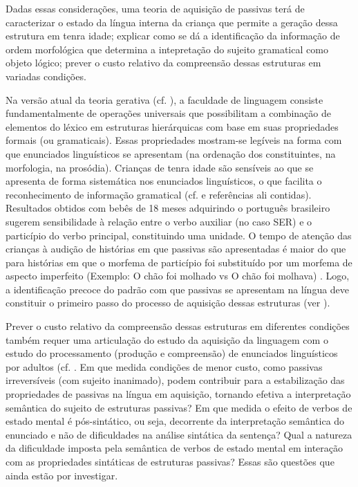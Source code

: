 \documentclass[output=paper]{LSP/langsci}
\begin{document}
Dadas essas considerações, uma teoria de aquisição de passivas terá de caracterizar o estado da língua interna da criança que permite a geração dessa estrutura em tenra idade; explicar como se dá a identificação da informação de ordem morfológica que determina a intepretação do sujeito gramatical como objeto lógico; prever o custo relativo da compreensão dessas estruturas em variadas condições.

Na versão atual da teoria gerativa (cf. \citealt{chomsky1995,chomsky2005,chomsky2007}), a faculdade de linguagem consiste fundamentalmente de operações universais que possibilitam a combinação de elementos do léxico em estruturas hierárquicas com base em suas propriedades formais (ou gramaticais). Essas propriedades mostram-se legíveis na forma com que enunciados linguísticos se apresentam (na ordenação dos constituintes, na morfologia, na prosódia). Crianças de tenra idade são sensíveis ao que se apresenta de forma sistemática nos enunciados linguísticos, o que facilita o reconhecimento de informação gramatical (cf. \citealt{correa2009,correa2014} e referências ali contidas). Resultados obtidos com bebês de 18 meses adquirindo o português brasileiro sugerem sensibilidade à relação entre o verbo auxiliar (no caso SER) e o particípio do verbo principal, constituindo uma unidade. O tempo de atenção das crianças à audição de histórias em que passivas são apresentadas é maior do que para histórias em que o morfema de particípio foi substituído por um morfema de aspecto imperfeito (Exemplo: O chão foi molhado vs O chão foi molhava) \citep{limajunior2016}.  Logo, a identificação precoce do padrão com que passivas se apresentam na língua deve constituir o primeiro passo do processo de aquisição dessas estruturas (ver \citealt{correa_etal2016}).

Prever o custo relativo da compreensão dessas estruturas em diferentes condições também requer uma articulação do estudo da aquisição da linguagem com o estudo do processamento (produção e compreensão) de enunciados linguísticos por adultos (cf. \citealt{correaaugusto2007,correa2014,limajuniorcorrea2015}. Em que medida condições de menor custo, como passivas irreversíveis (com sujeito inanimado), podem contribuir para a estabilização das propriedades de passivas na língua em aquisição, tornando efetiva a interpretação semântica do sujeito de estruturas passivas? Em que medida o efeito de verbos de estado mental é pós-sintático, ou seja, decorrente da interpretação semântica do enunciado e não de dificuldades na análise sintática da sentença? Qual a natureza da dificuldade imposta pela semântica de verbos de estado mental em interação com as propriedades sintáticas de estruturas passivas? Essas são questões que ainda estão por investigar. 
\end{document}
